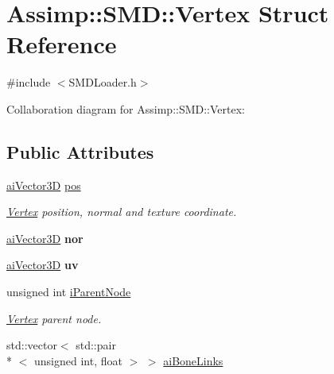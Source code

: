 \hypertarget{struct_assimp_1_1_s_m_d_1_1_vertex}{\section{Assimp\+:\+:S\+M\+D\+:\+:Vertex Struct Reference}
\label{struct_assimp_1_1_s_m_d_1_1_vertex}
}


{\ttfamily \#include $<$S\+M\+D\+Loader.\+h$>$}



Collaboration diagram for Assimp\+:\+:S\+M\+D\+:\+:Vertex\+:
\subsection*{Public Attributes}
\begin{DoxyCompactItemize}
\item 
\hypertarget{struct_assimp_1_1_s_m_d_1_1_vertex_a321842c641f37427c87cedc7a7e0f712}{\hyperlink{structai_vector3_d}{ai\+Vector3\+D} \hyperlink{struct_assimp_1_1_s_m_d_1_1_vertex_a321842c641f37427c87cedc7a7e0f712}{pos}}\label{struct_assimp_1_1_s_m_d_1_1_vertex_a321842c641f37427c87cedc7a7e0f712}

\begin{DoxyCompactList}\small\item\em \hyperlink{struct_assimp_1_1_s_m_d_1_1_vertex}{Vertex} position, normal and texture coordinate. \end{DoxyCompactList}\item 
\hypertarget{struct_assimp_1_1_s_m_d_1_1_vertex_ac5d0d909358e8a5c5c3cb765a2abf655}{\hyperlink{structai_vector3_d}{ai\+Vector3\+D} {\bfseries nor}}\label{struct_assimp_1_1_s_m_d_1_1_vertex_ac5d0d909358e8a5c5c3cb765a2abf655}

\item 
\hypertarget{struct_assimp_1_1_s_m_d_1_1_vertex_a57708390849807a0fadc5f5f46d9f21a}{\hyperlink{structai_vector3_d}{ai\+Vector3\+D} {\bfseries uv}}\label{struct_assimp_1_1_s_m_d_1_1_vertex_a57708390849807a0fadc5f5f46d9f21a}

\item 
\hypertarget{struct_assimp_1_1_s_m_d_1_1_vertex_ae50d685db6ae4a9012e4e89968423672}{unsigned int \hyperlink{struct_assimp_1_1_s_m_d_1_1_vertex_ae50d685db6ae4a9012e4e89968423672}{i\+Parent\+Node}}\label{struct_assimp_1_1_s_m_d_1_1_vertex_ae50d685db6ae4a9012e4e89968423672}

\begin{DoxyCompactList}\small\item\em \hyperlink{struct_assimp_1_1_s_m_d_1_1_vertex}{Vertex} parent node. \end{DoxyCompactList}\item 
std\+::vector$<$ std\+::pair\\*
$<$ unsigned int, float $>$ $>$ \hyperlink{struct_assimp_1_1_s_m_d_1_1_vertex_a7811d20e6dfde235c93223dd16b37bc9}{ai\+Bone\+Links}
\end{DoxyCompactItemize}


